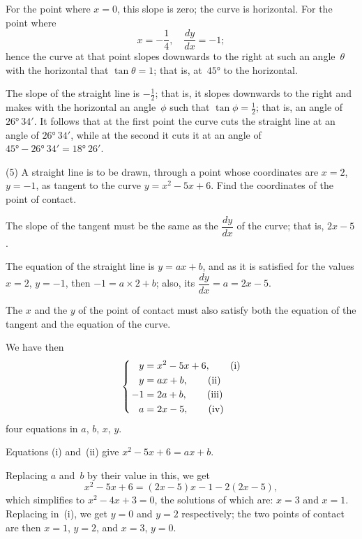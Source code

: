 \documentclass[12pt]{book}[2005/09/16]
\newcommand{\DPPageSep}[2]{\Pagelabel{#2}}
\newcommand{\Pagelabel}[1]
  {\phantomsection\label{#1}}
\begin{document}
For the point where $x = 0$, this slope is zero; the curve
is horizontal. For the point where
\[
x = -\dfrac{1}{4},\quad \dfrac{dy}{dx} = -1;
\]
hence the curve at that point slopes downwards to
the right at such an angle~$\theta$ with the horizontal that
$\tan \theta = 1$; that is, at~$45°$ to the horizontal.

The slope of the straight line is $-\tfrac{1}{2}$; that is, it slopes
downwards to the right and makes with the horizontal
an angle~$\phi$ such that $\tan \phi = \tfrac{1}{2}$; that is, an angle of
$26°~34'$. It follows that at the first point the curve
cuts the straight line at an angle of $26°~34'$, while at
the second it cuts it at an angle of $45° - 26°~34' = 18°~26'$.

(5) A straight line is to be drawn, through a point
whose coordinates are $x = 2$, $y = -1$, as tangent to the
curve $y = x^2 - 5x + 6$. Find the coordinates of the
point of contact.
\DPPageSep{102.png}{90}%

The slope of the tangent must be the same as the
$\dfrac{dy}{dx}$ of the curve; that is, $2x - 5$.

The equation of the straight line is $y = ax + b$, and
as it is satisfied for the values $x = 2$, $y = -1$, then
$-1 = a×2 + b$; also, its $\dfrac{dy}{dx} = a = 2x - 5$.

The $x$ and the $y$ of the point of contact must also
satisfy both the equation of the tangent and the
equation of the curve.

We have then
\begin{align*}
  y &= x^2 - 5x + 6, \tag*{(i)}   \\
  y &= ax + b,       \tag*{(ii)}  \\[-0.6\baselineskip]%
\smash{\left\{\begin{aligned} & \\ & \\ & \\ & \\ \end{aligned} \right.} \phantom{-1} & \\[-1.5ex]
 -1 &= 2a + b,       \tag*{(iii)} \\
  a &= 2x - 5,       \tag*{(iv)}
\end{align*}
four equations in $a$, $b$, $x$, $y$.

Equations (i) and~(ii) give $x^2 - 5x + 6 = ax+b$.

Replacing $a$ and~$b$ by their value in this, we get
\[
  x^2 - 5x + 6 = (2x - 5)x - 1 - 2(2x - 5),
\]
which simplifies to $x^2 - 4x + 3 = 0$, the solutions of
which are: $x = 3$ and $x = 1$. Replacing in~(i), we get
$y = 0$ and $y = 2$ respectively; the two points of contact
are then $x = 1$, $y = 2$, and $x = 3$, $y = 0$.
\end{document}
